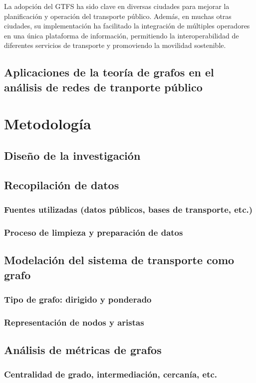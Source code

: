 \documentclass[openany]{book}
\begin{document}
    La adopción del GTFS ha sido clave en diversas ciudades para mejorar la planificación y operación del transporte público. Además, en muchas otras ciudades, su implementación ha facilitado la integración de múltiples operadores en una única plataforma de información, permitiendo la interoperabilidad de diferentes servicios de transporte y promoviendo la movilidad sostenible.

    \section{Aplicaciones de la teoría de grafos en el análisis de redes de tranporte público}

\chapter{Metodología}
	\section{Diseño de la investigación}
	\section{Recopilación de datos}
		\subsection{Fuentes utilizadas (datos públicos, bases de transporte, etc.)}
		\subsection{Proceso de limpieza y preparación de datos}
	\section{Modelación del sistema de transporte como grafo}
		\subsection{Tipo de grafo: dirigido y ponderado}
		\subsection{Representación de nodos y aristas}
	\section{Análisis de métricas de grafos}
		\subsection{Centralidad de grado, intermediación, cercanía, etc.}
\end{document}
